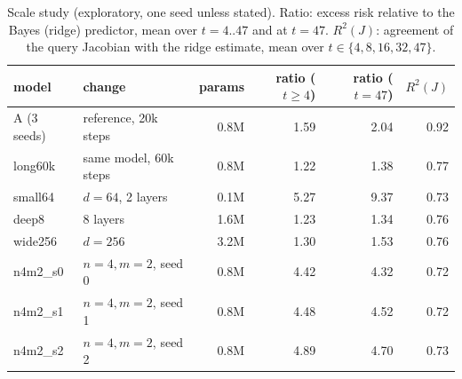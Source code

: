 \begin{table}[t]
\centering\small
\caption{Scale study (exploratory, one seed unless stated). Ratio: excess risk relative to the Bayes (ridge) predictor, mean over $t{=}4..47$ and at $t{=}47$. $R^2(J)$: agreement of the query Jacobian with the ridge estimate, mean over $t\in\{4,8,16,32,47\}$.}\label{tab:scale}
\begin{tabular}{llrrrr}
\toprule
model & change & params & ratio ($t\ge4$) & ratio ($t{=}47$) & $R^2(J)$ \\
\midrule
A (3 seeds) & reference, 20k steps & 0.8M & 1.59 & 2.04 & 0.92 \\
long60k & same model, 60k steps & 0.8M & 1.22 & 1.38 & 0.77 \\
small64 & $d{=}64$, 2 layers & 0.1M & 5.27 & 9.37 & 0.73 \\
deep8 & 8 layers & 1.6M & 1.23 & 1.34 & 0.76 \\
wide256 & $d{=}256$ & 3.2M & 1.30 & 1.53 & 0.76 \\
n4m2\_s0 & $n{=}4,m{=}2$, seed 0 & 0.8M & 4.42 & 4.32 & 0.72 \\
n4m2\_s1 & $n{=}4,m{=}2$, seed 1 & 0.8M & 4.48 & 4.52 & 0.72 \\
n4m2\_s2 & $n{=}4,m{=}2$, seed 2 & 0.8M & 4.89 & 4.70 & 0.73 \\
\bottomrule
\end{tabular}
\end{table}
